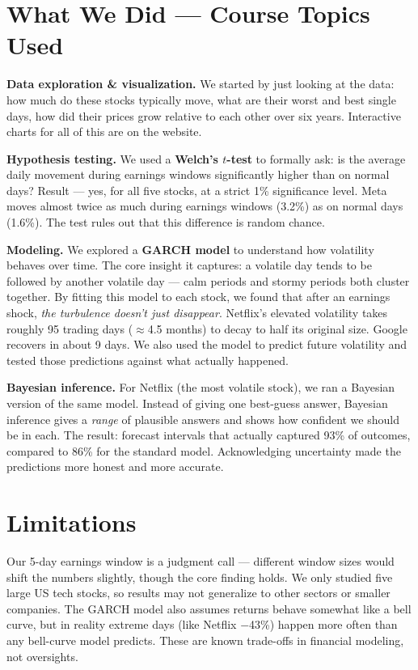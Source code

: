 \documentclass[11pt, letterpaper]{article}
\begin{document}
\section{What We Did --- Course Topics Used}

\textbf{Data exploration \& visualization.} We started by just looking at the
data: how much do these stocks typically move, what are their worst and best
single days, how did their prices grow relative to each other over six years.
Interactive charts for all of this are on the website.

\textbf{Hypothesis testing.} We used a \textbf{Welch's $t$-test} to formally
ask: is the average daily movement during earnings windows significantly higher
than on normal days? Result --- yes, for all five stocks, at a strict 1\%
significance level. Meta moves almost twice as much during earnings windows
(3.2\%) as on normal days (1.6\%). The test rules out that this difference is
random chance.

\textbf{Modeling.} We explored a \textbf{GARCH model} to understand how
volatility behaves over time. The core insight it captures: a volatile day
tends to be followed by another volatile day --- calm periods and stormy
periods both cluster together. By fitting this model to each stock, we found
that after an earnings shock, \textit{the turbulence doesn't just disappear}.
Netflix's elevated volatility takes roughly 95 trading days ($\approx$4.5
months) to decay to half its original size. Google recovers in about 9 days.
We also used the model to predict future volatility and tested those
predictions against what actually happened.

\textbf{Bayesian inference.} For Netflix (the most volatile stock), we ran a
Bayesian version of the same model. Instead of giving one best-guess answer,
Bayesian inference gives a \textit{range} of plausible answers and shows how
confident we should be in each. The result: forecast intervals that
actually captured 93\% of outcomes, compared to 86\% for the standard model.
Acknowledging uncertainty made the predictions more honest and more accurate.

\section{Limitations}

Our 5-day earnings window is a judgment call --- different window sizes would
shift the numbers slightly, though the core finding holds. We only studied
five large US tech stocks, so results may not generalize to other sectors or
smaller companies. The GARCH model also assumes returns behave somewhat like a
bell curve, but in reality extreme days (like Netflix $-$43\%) happen more
often than any bell-curve model predicts. These are known trade-offs in
financial modeling, not oversights.
\end{document}
